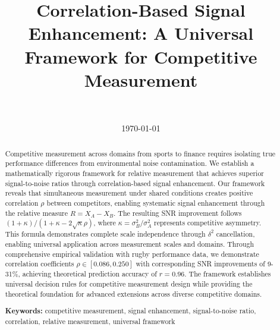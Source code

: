 \documentclass[11pt,a4paper]{article}
\title{Correlation-Based Signal Enhancement: A Universal Framework for Competitive Measurement}
\author{
    \authorone \\
    \textit{\affiliationone}
}
\date{\today}
\begin{document}
\maketitle

\begin{abstract}
Competitive measurement across domains from sports to finance requires isolating true performance differences from environmental noise contamination. We establish a mathematically rigorous framework for relative measurement that achieves superior signal-to-noise ratios through correlation-based signal enhancement. Our framework reveals that simultaneous measurement under shared conditions creates positive correlation $\rho$ between competitors, enabling systematic signal enhancement through the relative measure $R = X_A - X_B$. The resulting SNR improvement follows $(1 + \kappa)/(1 + \kappa - 2\sqrt{\kappa}\rho)$, where $\kappa = \sigma_B^2/\sigma_A^2$ represents competitive asymmetry. This formula demonstrates complete scale independence through $\delta^2$ cancellation, enabling universal application across measurement scales and domains. Through comprehensive empirical validation with rugby performance data, we demonstrate correlation coefficients $\rho \in [0.086, 0.250]$ with corresponding SNR improvements of 9-31\%, achieving theoretical prediction accuracy of $r = 0.96$. The framework establishes universal decision rules for competitive measurement design while providing the theoretical foundation for advanced extensions across diverse competitive domains.

\textbf{Keywords:} competitive measurement, signal enhancement, signal-to-noise ratio, correlation, relative measurement, universal framework
\end{abstract}













\end{document}
